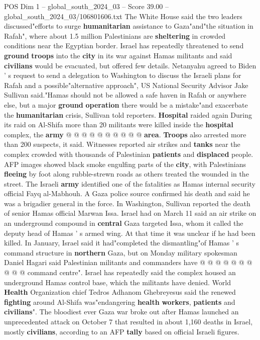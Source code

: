 \begin{textsample}{POS Dim 1 – global\_south\_2024\_03 – Score 39.00 – global\_south\_2024\_03/106801606.txt}
The White House said the two leaders discussed"efforts to surge \textbf{humanitarian} assistance to Gaza"and"the situation in Rafah", where about 1.5 million Palestinians are \textbf{sheltering} in crowded conditions near the Egyptian border.
Israel has repeatedly threatened to send \textbf{ground} \textbf{troops} into the \textbf{city} in its war against Hamas militants and said \textbf{civilians} would be evacuated, but offered few details.
Netanyahu agreed to Biden ' s request to send a delegation to Washington to discuss the Israeli plans for Rafah and a possible"alternative approach", US National Security Advisor Jake Sullivan said."Hamas should not be allowed a safe haven in Rafah or anywhere else, but a major \textbf{ground} \textbf{operation} there would be a mistake"and exacerbate the \textbf{humanitarian} crisis, Sullivan told reporters. \textbf{Hospital} raided again During its raid on Al-Shifa more than 20 militants were killed inside the \textbf{hospital} complex, the \textbf{army} @ @ @ @ @ @ @ @ @ @ \textbf{area}. \textbf{Troops} also arrested more than 200 suspects, it said.
Witnesses reported air strikes and \textbf{tanks} near the complex crowded with thousands of Palestinian \textbf{patients} and \textbf{displaced} people.
AFP images showed black smoke engulfing parts of the \textbf{city}, with Palestinians \textbf{fleeing} by foot along rubble-strewn roads as others treated the wounded in the street.
The Israeli \textbf{army} identified one of the fatalities as Hamas internal security official Fayq al-Mabhouh.
A Gaza police source confirmed his death and said he was a brigadier general in the force.
In Washington, Sullivan reported the death of senior Hamas official Marwan Issa.
Israel had on March 11 said an air strike on an underground compound in \textbf{central} Gaza targeted Issa, whom it called the deputy head of Hamas ' s armed wing.
At that time it was unclear if he had been killed.
In January, Israel said it had"completed the dismantling"of Hamas ' s command structure in \textbf{northern} Gaza, but on Monday military spokesman Daniel Hagari said Palestinian militants and commanders have @ @ @ @ @ @ @ @ @ @ command centre".
Israel has repeatedly said the complex housed an underground Hamas control base, which the militants have denied.
World \textbf{Health} Organization chief Tedros Adhanom Ghebreyesus said the renewed \textbf{fighting} around Al-Shifa was"endangering \textbf{health} \textbf{workers}, \textbf{patients} and \textbf{civilians}".
The bloodiest ever Gaza war broke out after Hamas launched an unprecedented attack on October 7 that resulted in about 1,160 deaths in Israel, mostly \textbf{civilians}, according to an AFP \textbf{tally} based on official Israeli figures.

\end{textsample}
